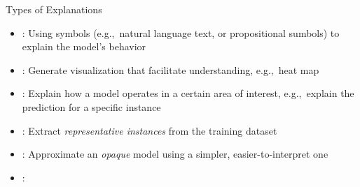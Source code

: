 \documentclass[11pt,dvipsnames,usenames,aspectratio=169]{beamer}  %
\begin{document}
\begin{frame}{Types of Explanations}{}
  {\small
    \begin{itemize}[<+->]
      \setlength{\itemsep}{15pt}
      \item \textbf{}: Using symbols (e.g.,~natural language text, or propositional sumbols) to explain the model's behavior
      \item \textbf{}: Generate visualization that facilitate understanding, e.g.,~heat map
      \item \textbf{}: Explain how a model operates in a certain area of interest, e.g.,~explain the prediction for a specific instance
      \item \textbf{}: Extract \textit{representative instances} from the training dataset
      \item \textbf{}: Approximate an \textit{opaque} model using a simpler, easier-to-interpret one
      \item \textbf{\green{}}:
    \end{itemize}
  }
\end{frame}
\end{document}
